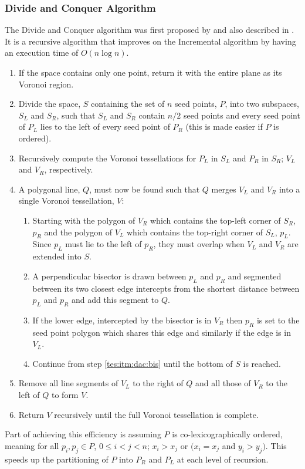 \subsubsection{Divide and Conquer Algorithm}\label{tes:ssec:dac}
The Divide and Conquer algorithm was first proposed by \citet{shamos1975closest} and also described in \citet{okabe2009spatial}. It is a recursive algorithm that improves on the Incremental algorithm by having an execution time of $O(n\log n)$.
\begin{enumerate}
\item If the space contains only one point, return it with the entire plane as its Voronoi region.
\item Divide the space, $S$ containing the set of $n$ seed points, $P$, into two subspaces, $S_L$ and $S_R$, such that $S_L$ and $S_R$ contain $n/2$ seed points and every seed point of $P_L$ lies to the left of every seed point of $P_R$ (this is made easier if $P$ is ordered).
\item Recursively compute the Voronoi tessellations for $P_L$ in $S_L$ and $P_R$ in $S_R$; $V_L$ and $V_R$, respectively.
\item A polygonal line, $Q$, must now be found such that $Q$ merges $V_L$ and $V_R$ into a single Voronoi tessellation, $V$:
\begin{enumerate}
 \item Starting with the polygon of $V_R$ which contains the top-left corner of $S_R$, $p_R$ and the polygon of $V_L$ which contains the top-right corner of $S_L$, $p_L$. Since $p_L$ must lie to the left of $p_R$, they must overlap when $V_L$ and $V_R$ are extended into $S$.
 \item\label{tes:itm:dac:bis} A perpendicular bisector is drawn between $p_L$ and $p_R$ and segmented between its two closest edge intercepts from the shortest distance between $p_L$ and $p_R$ and add this segment to $Q$.
 \item If the lower edge, intercepted by the bisector is in $V_R$ then $p_R$ is set to the seed point polygon which shares this edge and similarly if the edge is in $V_L$.
 \item Continue from step \ref{tes:itm:dac:bis} until the bottom of $S$ is reached.
\end{enumerate}
\item Remove all line segments of $V_L$ to the right of $Q$ and all those of $V_R$ to the left of $Q$ to form $V$.
\item Return $V$ recursively until the full Voronoi tessellation is complete.
\end{enumerate}
Part of achieving this efficiency is assuming $P$ is co-lexicographically ordered, meaning for all $p_i,p_j \in P$, $0 \leq i < j < n$; $x_i > x_j$ or $(x_i = x_j$ and $y_i > y_j)$. This speeds up the partitioning of $P$ into $P_R$ and $P_L$ at each level of recursion.
%
